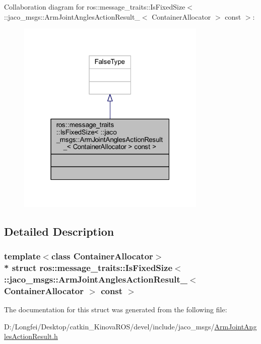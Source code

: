 Collaboration diagram for ros\+:\+:message\+\_\+traits\+:\+:Is\+Fixed\+Size$<$ \+:\+:jaco\+\_\+msgs\+:\+:Arm\+Joint\+Angles\+Action\+Result\+\_\+$<$ Container\+Allocator $>$ const $>$\+:
\nopagebreak
\begin{figure}[H]
\begin{center}
\leavevmode
\includegraphics[width=256pt]{d5/d48/structros_1_1message__traits_1_1IsFixedSize_3_01_1_1jaco__msgs_1_1ArmJointAnglesActionResult___3bc7510784ab767216ef6e5c298bb1825}
\end{center}
\end{figure}


\subsection{Detailed Description}
\subsubsection*{template$<$class Container\+Allocator$>$\\*
struct ros\+::message\+\_\+traits\+::\+Is\+Fixed\+Size$<$ \+::jaco\+\_\+msgs\+::\+Arm\+Joint\+Angles\+Action\+Result\+\_\+$<$ Container\+Allocator $>$ const  $>$}



The documentation for this struct was generated from the following file\+:\begin{DoxyCompactItemize}
\item 
D\+:/\+Longfei/\+Desktop/catkin\+\_\+\+Kinova\+R\+O\+S/devel/include/jaco\+\_\+msgs/\hyperlink{ArmJointAnglesActionResult_8h}{Arm\+Joint\+Angles\+Action\+Result.\+h}\end{DoxyCompactItemize}
